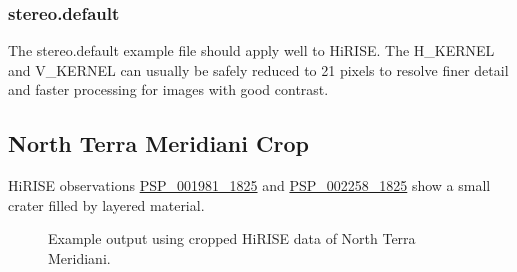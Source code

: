 \subsubsection*{stereo.default}

The stereo.default example file should apply well to HiRISE. The
H\_KERNEL and V\_KERNEL can usually be safely reduced to 21 pixels to
resolve finer detail and faster processing for images with good
contrast.

\clearpage
\subsection{North Terra Meridiani Crop}

\ac{HiRISE} observations
\href{http://hirise.lpl.arizona.edu/PSP_001981_1825}{PSP\_001981\_1825} and
\href{http://hirise.lpl.arizona.edu/PSP_002258_1825}{PSP\_002258\_1825}
show a small crater filled by layered material.

\begin{figure}[h!]
\centering
  \hfil
\caption{Example output using cropped HiRISE data of North Terra Meridiani.}
\label{fig:hirise_nterra_example}
\end{figure}

